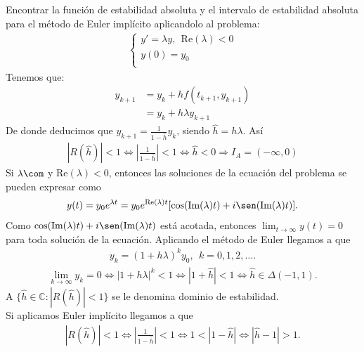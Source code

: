 \begin{ejemplo}
Encontrar la función de estabilidad absoluta y el intervalo de estabilidad absoluta para el método de Euler implícito aplicandolo al problema:
\begin{align*}
    \left\{ \begin{array}{lcc}
             y' = \lambda y, \ \ \text{Re}(\lambda) < 0\\
             y(0) = y_0 \\
             \end{array}
   \right.
\end{align*}
Tenemos que:
\begin{align*}
    y_{k+1} &= y_k + hf(t_{k+1},y_{k+1}) \\
            &= y_k + h\lambda y_{k+1} 
\end{align*}
De donde deducimos que $y_{k+1} = \frac{1}{1-\hat{h}}y_k$, siendo $\hat{h} = h\lambda$. Así
\begin{align*}
    |R(\hat{h})| < 1 \Longleftrightarrow \left| \frac{1}{1-\hat{h}} \right| < 1 \Longleftrightarrow \hat{h} < 0 \Longrightarrow I_A = (-\infty,0)
\end{align*}
Si $\lambda \com$ y $\text{Re}(\lambda) < 0$, entonces las soluciones de la ecuación del problema se pueden expresar como
\begin{align*}
    y(t) = y_0 e^{\lambda t} = y_0 e^{\text{Re}(\lambda)t}[\cos(\text{Im}(\lambda)t) + i\sen(\text{Im}(\lambda)t)].
\end{align*}
Como $\cos(\text{Im}(\lambda)t) + i\sen(\text{Im}(\lambda)t)$ está acotada, entonces $\lim_{t \to \infty} y(t) = 0$ para toda solución de la ecuación. Aplicando el método de Euler  llegamos a que
\begin{align*}
    y_k = (1 + h\lambda)^ky_0, \ \ k = 0,1,2,\ldots.
\end{align*}
\begin{align*}
    \lim_{k \to \infty} y_k = 0 \Longleftrightarrow |1+ h\lambda|^k < 1 \Longleftrightarrow |1 + \hat{h}| < 1 \Longleftrightarrow \hat{h} \in \Delta(-1,1).
\end{align*}
A $\{ \hat{h} \in \mathbb{C} : |R(\hat{h})| < 1\}$ se le denomina dominio de estabilidad.
\\
\newline
\noindent Si aplicamos Euler implícito llegamos a que 
\begin{align*}
    |R(\hat{h})| < 1 \Longleftrightarrow \left| \frac{1}{1-\hat{h}} \right| < 1 \Longleftrightarrow  1 < |1 -\hat{h}| \Longleftrightarrow |\hat{h} -1| > 1.

\end{align*}
\end{ejemplo}
